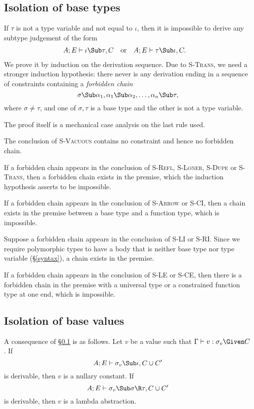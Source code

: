 \documentclass{amsart}
\theoremstyle{definition}
\begin{document}
\subsection{Isolation of base types}
\label{isotypes}
If $\tau$ is not a type variable and not equal to $\iota$, then
it is impossible to derive any subtype judgement of the form
\begin{align*}
A;E&\vdash \iota\Sub\tau,C&
&\mbox{or}&
A;E&\vdash\tau\Sub\iota,C.
\end{align*}
We prove it by induction on the derivation sequence. Due to
\textsc{S-Trans}, we need a stronger induction hypothesis: there
never is any derivation ending in a sequence of constraints
containing a \emph{forbidden chain}
\[
\sigma\Sub\alpha_1,\alpha_1\Sub\alpha_2,\ldots,\alpha_n\Sub\tau,
\]
where $\sigma\neq\tau$, and one of $\sigma,\tau$ is a base type
and the other is not a type variable.

The proof itself is a mechanical case analysis on the last rule
used.

The conclusion of \textsc{S-Vacuous} contains no constraint and
hence no forbidden chain.

If a forbidden chain appears in the conclusion of \textsc{S-Refl},
\textsc{S-Loner}, \textsc{S-Dupe} or \textsc{S-Trans}, then a
forbidden chain exists in the premise, which the induction
hypothesis asserts to be impossible.

If a forbidden chain appears in the conclusion of
\textsc{S-Arrow} or \textsc{S-CI}, then a chain exists in the
premise between a base type and a function type, which is
impossible.

Suppose a forbidden chain appears in the conclusion of
\textsc{S-LI} or \textsc{S-RI}. Since we require polymorphic
types to have a body that is neither base type nor type variable
(\S\ref{syntax}), a chain exists in the premise.

If a forbidden chain appears in the conclusion of \textsc{S-LE}
or \textsc{S-CE}, then there is a forbidden chain in the premise
with a universal type or a constrained function type at one end,
which is impossible.

\subsection{Isolation of base values}
\label{isovalues}
A consequence of \S\ref{isotypes} is as follows. Let $v$ be a
value such that $\Gamma\vdash v:\sigma_v\Given C$. If
\[
A;E\vdash \sigma_v\Sub\iota,C\cup C'
\]
is derivable, then $v$ is a nullary constant. If
\[
A;E\vdash \sigma_v\Sub\sigma\R\tau,C\cup C'
\]
is derivable, then $v$ is a lambda abstraction.
\end{document}
